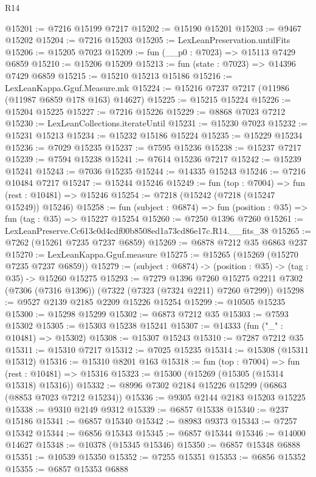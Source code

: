 \begin{lexlean}{R14}
\begin{coremodule}
@15201 := @7216 @15199 @7217
@15202 := @15190 @15201
@15203 := @9467 @15202
@15204 := @7216 @15203
@15205 := LexLeanPreservation.untilFits
@15206 := @15205 @7023
@15209 := fun (__p0 : @7023) => @15113 @7429 @6859
@15210 := @15206 @15209
@15213 := fun (state : @7023) => @14396 @7429 @6859
@15215 := @15210 @15213 @15186
@15216 := LexLeanKappa.Gguf.Measure.mk
@15224 := @15216 @7237 @7217 (@11986 (@11987 @6859 @178 @163) @14627)
@15225 := @15215 @15224
@15226 := @15204 @15225
@15227 := @7216 @15226
@15229 := @8868 @7023 @7212
@15230 := LexLeanCollections.iterateUntil
@15231 := @15230 @7023
@15232 := @15231 @15213
@15234 := @15232 @15186 @15224
@15235 := @15229 @15234
@15236 := @7029 @15235
@15237 := @7595 @15236
@15238 := @15237 @7217
@15239 := @7594 @15238
@15241 := @7614 @15236 @7217
@15242 := @15239 @15241
@15243 := @7036 @15235
@15244 := @14335 @15243
@15246 := @7216 @10484 @7217
@15247 := @15244 @15246
@15249 := fun (top : @7004) => fun (rest : @10481) => @15246
@15254 := @7218 (@15242 (@7218 (@15247 @15249)) @15246)
@15258 := fun (subject : @6874) => fun (position : @35) => fun (tag : @35) => @15227 @15254
@15260 := @7250 @1396 @7260
@15261 := LexLeanPreserve.Cc613c0d4cdf00b8508ed1a73cd86e17c.R14.__fits_38
@15265 := @7262 (@15261 @7235 @7237 @6859)
@15269 := @6878 @7212 @35 @6863 @237
@15270 := LexLeanKappa.Gguf.measure
@15275 := @15265 (@15269 (@15270 @7235 @7237 @6859))
@15279 := (subject : @6874) -> (position : @35) -> (tag : @35) -> @15260 @15275
@15293 := @7279
    @1396
    @7260
    @15275
    @2211
    @7302
    (@7306 (@7316 @1396))
    (@7322 (@7323 (@7324 @2211) @7260 @7299))
@15298 := @9527 @2139 @2185 @2209 @15226 @15254
@15299 := @10505 @15235
@15300 := @15298 @15299
@15302 := @6873 @7212 @35
@15303 := @7593 @15302
@15305 := @15303 @15238 @15241
@15307 := @14333 (fun ("_" : @10481) => @15302)
@15308 := @15307 @15243
@15310 := @7287 @7212 @35
@15311 := @15310 @7217
@15312 := @7025 @15235
@15314 := @15308 (@15311 @15312)
@15316 := @15310 @8201 @163
@15318 := fun (top : @7004) => fun (rest : @10481) => @15316
@15323 := @15300 (@15269 (@15305 (@15314 @15318) @15316))
@15332 := @8996 @7302 @2184 @15226 @15299 (@6863 (@8853 @7023 @7212 @15234))
@15336 := @9305 @2144 @2183 @15203 @15225
@15338 := @9310 @2149 @9312
@15339 := @6857 @15338
@15340 := @237 @15186
@15341 := @6857 @15340
@15342 := @8983 @9373
@15343 := @7257 @15342
@15344 := @6856 @15343
@15345 := @6857 @15344
@15346 := @14000 @14627
@15348 := @10378 (@15345 @15346)
@15350 := @6857 @15348 @6888
@15351 := @10539 @15350
@15352 := @7255 @15351
@15353 := @6856 @15352
@15355 := @6857 @15353 @6888

\end{coremodule}
\end{lexlean}
